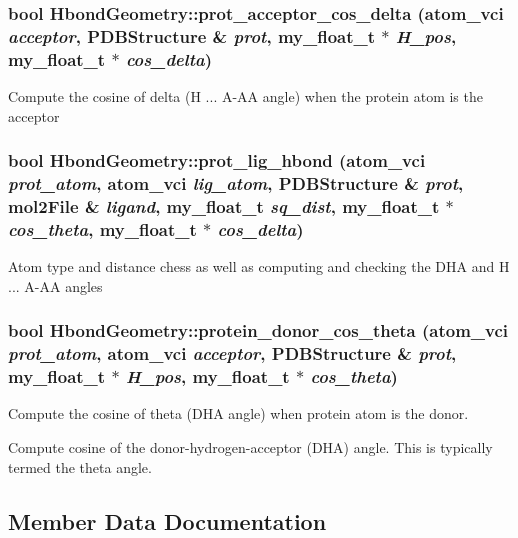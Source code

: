 \subsubsection{\setlength{\rightskip}{0pt plus 5cm}bool Hbond\-Geometry::prot\_\-acceptor\_\-cos\_\-delta (atom\_\-vci {\em acceptor}, \bf{PDBStructure} \& {\em prot}, my\_\-float\_\-t $\ast$ {\em H\_\-pos}, my\_\-float\_\-t $\ast$ {\em cos\_\-delta})}\label{classSimSite3D_1_1HbondGeometry_f618291bc802e111027a06eb98ca1946}


Compute the cosine of delta (H ... A-AA angle) when the protein atom is the acceptor 
\subsubsection{\setlength{\rightskip}{0pt plus 5cm}bool Hbond\-Geometry::prot\_\-lig\_\-hbond (atom\_\-vci {\em prot\_\-atom}, atom\_\-vci {\em lig\_\-atom}, \bf{PDBStructure} \& {\em prot}, \bf{mol2File} \& {\em ligand}, my\_\-float\_\-t {\em sq\_\-dist}, my\_\-float\_\-t $\ast$ {\em cos\_\-theta}, my\_\-float\_\-t $\ast$ {\em cos\_\-delta})}\label{classSimSite3D_1_1HbondGeometry_f285f2ddcc67f20d410fdccf1d053ed4}


Atom type and distance chess as well as computing and checking the DHA and H ... A-AA angles 
\subsubsection{\setlength{\rightskip}{0pt plus 5cm}bool Hbond\-Geometry::protein\_\-donor\_\-cos\_\-theta (atom\_\-vci {\em prot\_\-atom}, atom\_\-vci {\em acceptor}, \bf{PDBStructure} \& {\em prot}, my\_\-float\_\-t $\ast$ {\em H\_\-pos}, my\_\-float\_\-t $\ast$ {\em cos\_\-theta})}\label{classSimSite3D_1_1HbondGeometry_af52b4614187640cdad06cbddab9655f}


Compute the cosine of theta (DHA angle) when protein atom is the donor. 

Compute cosine of the donor-hydrogen-acceptor (DHA) angle. This is typically termed the theta angle. 

\subsection{Member Data Documentation}
